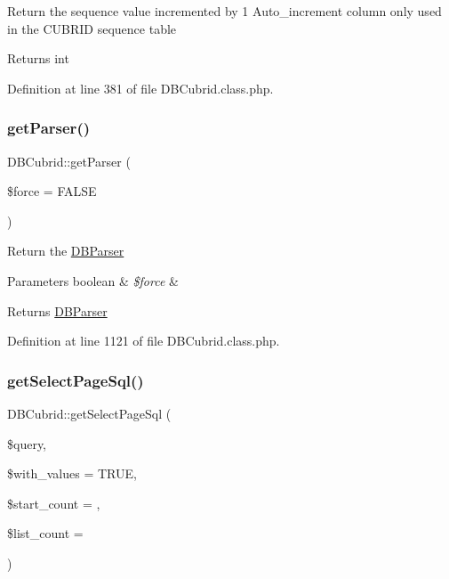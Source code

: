 Return the sequence value incremented by 1 Auto\+\_\+increment column only used in the C\+U\+B\+R\+ID sequence table \begin{DoxyReturn}{Returns}
int 
\end{DoxyReturn}


Definition at line 381 of file D\+B\+Cubrid.\+class.\+php.

\mbox{\label{classDBCubrid_a9c9bbb9e0958527af5e3ebcfb427b496}} 
\subsubsection{\texorpdfstring{get\+Parser()}{getParser()}}
{\footnotesize\ttfamily D\+B\+Cubrid\+::get\+Parser (\begin{DoxyParamCaption}\item[{}]{\$force = {\ttfamily FALSE} }\end{DoxyParamCaption})}

Return the \hyperlink{classDBParser}{D\+B\+Parser} 
\begin{DoxyParams}[1]{Parameters}
boolean & {\em \$force} & \\
\hline
\end{DoxyParams}
\begin{DoxyReturn}{Returns}
\hyperlink{classDBParser}{D\+B\+Parser} 
\end{DoxyReturn}


Definition at line 1121 of file D\+B\+Cubrid.\+class.\+php.

\mbox{\label{classDBCubrid_ace7731acbdb4ed72497be48092b0997f}} 
\subsubsection{\texorpdfstring{get\+Select\+Page\+Sql()}{getSelectPageSql()}}
{\footnotesize\ttfamily D\+B\+Cubrid\+::get\+Select\+Page\+Sql (\begin{DoxyParamCaption}\item[{}]{\$query,  }\item[{}]{\$with\+\_\+values = {\ttfamily TRUE},  }\item[{}]{\$start\+\_\+count = {},  }\item[{}]{\$list\+\_\+count = {} }\end{DoxyParamCaption})}

